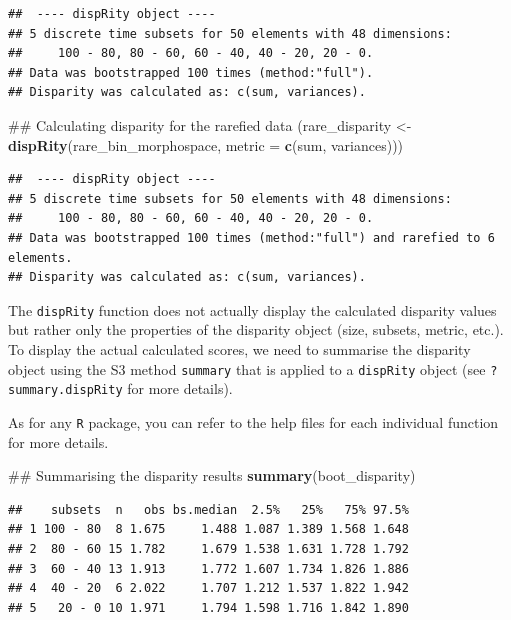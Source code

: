 \documentclass[]{book}
\newenvironment{Shaded}{\begin{snugshade}}{\end{snugshade}}
\newcommand{\KeywordTok}[1]{\textcolor[rgb]{0.13,0.29,0.53}{\textbf{#1}}}
\newcommand{\DataTypeTok}[1]{\textcolor[rgb]{0.13,0.29,0.53}{#1}}
\newcommand{\StringTok}[1]{\textcolor[rgb]{0.31,0.60,0.02}{#1}}
\newcommand{\NormalTok}[1]{#1}
\theoremstyle{definition}
\theoremstyle{definition}
\theoremstyle{remark}
\begin{document}
\begin{verbatim}
##  ---- dispRity object ---- 
## 5 discrete time subsets for 50 elements with 48 dimensions:
##     100 - 80, 80 - 60, 60 - 40, 40 - 20, 20 - 0.
## Data was bootstrapped 100 times (method:"full").
## Disparity was calculated as: c(sum, variances).
\end{verbatim}

\begin{Shaded}
\begin{Highlighting}[]
\NormalTok{## Calculating disparity for the rarefied data}
\NormalTok{(rare_disparity <-}\StringTok{ }\KeywordTok{dispRity}\NormalTok{(rare_bin_morphospace, }\DataTypeTok{metric =} \KeywordTok{c}\NormalTok{(sum, variances)))}
\end{Highlighting}
\end{Shaded}

\begin{verbatim}
##  ---- dispRity object ---- 
## 5 discrete time subsets for 50 elements with 48 dimensions:
##     100 - 80, 80 - 60, 60 - 40, 40 - 20, 20 - 0.
## Data was bootstrapped 100 times (method:"full") and rarefied to 6 elements.
## Disparity was calculated as: c(sum, variances).
\end{verbatim}

The \texttt{dispRity} function does not actually display the calculated
disparity values but rather only the properties of the disparity object
(size, subsets, metric, etc.). To display the actual calculated scores,
we need to summarise the disparity object using the S3 method
\texttt{summary} that is applied to a \texttt{dispRity} object (see
\texttt{?summary.dispRity} for more details).

As for any \texttt{R} package, you can refer to the help files for each
individual function for more details.

\begin{Shaded}
\begin{Highlighting}[]
\NormalTok{## Summarising the disparity results}
\KeywordTok{summary}\NormalTok{(boot_disparity)}
\end{Highlighting}
\end{Shaded}

\begin{verbatim}
##    subsets  n   obs bs.median  2.5%   25%   75% 97.5%
## 1 100 - 80  8 1.675     1.488 1.087 1.389 1.568 1.648
## 2  80 - 60 15 1.782     1.679 1.538 1.631 1.728 1.792
## 3  60 - 40 13 1.913     1.772 1.607 1.734 1.826 1.886
## 4  40 - 20  6 2.022     1.707 1.212 1.537 1.822 1.942
## 5   20 - 0 10 1.971     1.794 1.598 1.716 1.842 1.890
\end{verbatim}
\end{document}
